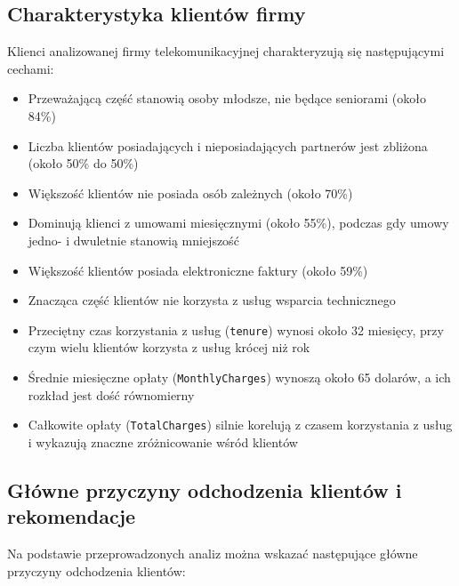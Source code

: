 \documentclass[12pt, a4paper]{article}\usepackage[]{graphicx}\usepackage[]{xcolor}
\begin{document}
\subsection{Charakterystyka klientów firmy}
Klienci analizowanej firmy telekomunikacyjnej charakteryzują się następującymi cechami:
\begin{itemize}
  \item Przeważającą część stanowią osoby młodsze, nie będące seniorami (około 84\%)
  \item Liczba klientów posiadających i nieposiadających partnerów jest zbliżona (około 50\% do 50\%)
  \item Większość klientów nie posiada osób zależnych (około 70\%)
  \item Dominują klienci z umowami miesięcznymi (około 55\%), podczas gdy umowy jedno- i dwuletnie stanowią mniejszość
  \item Większość klientów posiada elektroniczne faktury (około 59\%)
  \item Znacząca część klientów nie korzysta z usług wsparcia technicznego
  \item Przeciętny czas korzystania z usług (\texttt{tenure}) wynosi około 32 miesięcy, przy czym wielu klientów korzysta z usług krócej niż rok
  \item Średnie miesięczne opłaty (\texttt{MonthlyCharges}) wynoszą około 65 dolarów, a ich rozkład jest dość równomierny
  \item Całkowite opłaty (\texttt{TotalCharges}) silnie korelują z czasem korzystania z usług i wykazują znaczne zróżnicowanie wśród klientów
\end{itemize}

\subsection{Główne przyczyny odchodzenia klientów i rekomendacje}
Na podstawie przeprowadzonych analiz można wskazać następujące główne przyczyny odchodzenia klientów:
\end{document}
